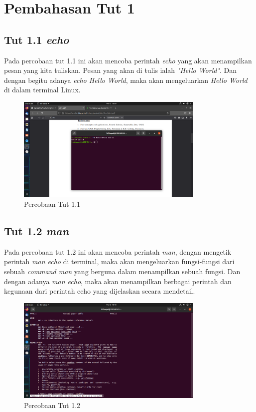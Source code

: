\documentclass[11pt,a4paper]{article}
\begin{document}
\section{Pembahasan Tut 1}
\subsection{Tut 1.1 \textit{echo}}
	Pada percobaan tut 1.1 ini akan mencoba perintah \textit{echo} yang akan menampilkan pesan yang kita tuliskan. Pesan yang akan 
	di tulis ialah \textit{"Hello World"}. Dan dengan begitu adanya \textit{echo Hello World}, maka akan mengeluarkan \textit{Hello World} 
	di dalam terminal Linux.
	\begin{figure}[h]
		\centering
		\includegraphics[width=0.8\textwidth]{Figure/tut 1.1.png}
		\caption{Percobaan Tut 1.1}
	\end{figure}

\subsection{Tut 1.2 \textit{man}}
    Pada percobaan tut 1.2 ini akan mencoba perintah \textit{man}, dengan mengetik perintah \textit{man echo} di terminal, maka akan 
	mengeluarkan fungsi-fungsi dari sebuah \textit{command man} yang berguna dalam menampilkan sebuah fungsi. Dan dengan adanya \textit{man echo},
	maka akan menampilkan berbagai perintah dan kegunaan dari perintah echo yang dijelaskan secara mendetail.
	\begin{figure}[h]
		\centering
		\includegraphics[width=0.8\textwidth]{Figure/tut 1.2.png}
		\caption{Percobaan Tut 1.2}
	\end{figure}
\end{document}
